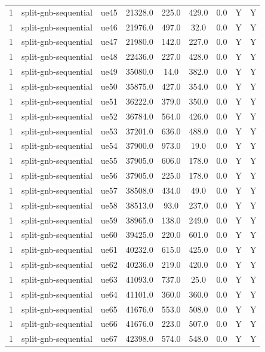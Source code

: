 \begin{table}[ht]
\begin{tabular}{|c|c|c|c|c|c|c|c|c|}
1 & split-gnb-sequential & ue45 & 21328.0 & 225.0 & 429.0 & 0.0 & Y & Y \\
1 & split-gnb-sequential & ue46 & 21976.0 & 497.0 & 32.0 & 0.0 & Y & Y \\
1 & split-gnb-sequential & ue47 & 21980.0 & 142.0 & 227.0 & 0.0 & Y & Y \\
1 & split-gnb-sequential & ue48 & 22436.0 & 227.0 & 428.0 & 0.0 & Y & Y \\
1 & split-gnb-sequential & ue49 & 35080.0 & 14.0 & 382.0 & 0.0 & Y & Y \\
1 & split-gnb-sequential & ue50 & 35875.0 & 427.0 & 354.0 & 0.0 & Y & Y \\
1 & split-gnb-sequential & ue51 & 36222.0 & 379.0 & 350.0 & 0.0 & Y & Y \\
1 & split-gnb-sequential & ue52 & 36784.0 & 564.0 & 426.0 & 0.0 & Y & Y \\
1 & split-gnb-sequential & ue53 & 37201.0 & 636.0 & 488.0 & 0.0 & Y & Y \\
1 & split-gnb-sequential & ue54 & 37900.0 & 973.0 & 19.0 & 0.0 & Y & Y \\
1 & split-gnb-sequential & ue55 & 37905.0 & 606.0 & 178.0 & 0.0 & Y & Y \\
1 & split-gnb-sequential & ue56 & 37905.0 & 225.0 & 178.0 & 0.0 & Y & Y \\
1 & split-gnb-sequential & ue57 & 38508.0 & 434.0 & 49.0 & 0.0 & Y & Y \\
1 & split-gnb-sequential & ue58 & 38513.0 & 93.0 & 237.0 & 0.0 & Y & Y \\
1 & split-gnb-sequential & ue59 & 38965.0 & 138.0 & 249.0 & 0.0 & Y & Y \\
1 & split-gnb-sequential & ue60 & 39425.0 & 220.0 & 601.0 & 0.0 & Y & Y \\
1 & split-gnb-sequential & ue61 & 40232.0 & 615.0 & 425.0 & 0.0 & Y & Y \\
1 & split-gnb-sequential & ue62 & 40236.0 & 219.0 & 420.0 & 0.0 & Y & Y \\
1 & split-gnb-sequential & ue63 & 41093.0 & 737.0 & 25.0 & 0.0 & Y & Y \\
1 & split-gnb-sequential & ue64 & 41101.0 & 360.0 & 360.0 & 0.0 & Y & Y \\
1 & split-gnb-sequential & ue65 & 41676.0 & 553.0 & 508.0 & 0.0 & Y & Y \\
1 & split-gnb-sequential & ue66 & 41676.0 & 223.0 & 507.0 & 0.0 & Y & Y \\
1 & split-gnb-sequential & ue67 & 42398.0 & 574.0 & 548.0 & 0.0 & Y & Y \\

\end{tabular}
\end{table}
